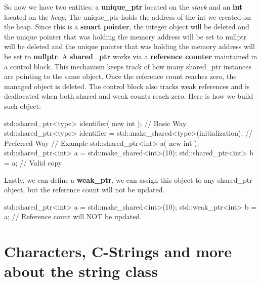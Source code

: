 \documentclass{report}
\begin{document}
    \bigbreak \noindent 
    So now we have two entities: a \textbf{unique\_ptr} located on the \textit{stack} and an \textbf{int} located on the \textit{heap}. The unique\_ptr holds the address of the int we created on the heap. Since this is a \textbf{smart pointer}, the integer object will be deleted and the unique pointer that was holding the memory address will be set to nullptr will be deleted and the unique pointer that was holding the memory address will be set to \textbf{nullptr}.
    \bigbreak \noindent 
    A \textbf{shared\_ptr} works via a \textbf{reference counter} maintained in a control block. This mechanism keeps track of how many shared\_ptr instances are pointing to the same object. Once the reference count reaches zero, the managed object is deleted. The control block also tracks weak references and is deallocated when both shared and weak counts reach zero. Here is how we build such object:
    \bigbreak \noindent 
    
    \begin{cppcode}
std::shared_ptr<type> identifier( new int ); // Basic Way
std::shared_ptr<type> identifier = std::make_shared<type>(initialization); // Preferred Way
// Example
std::shared_ptr<int> a( new int );
std::shared_ptr<int> a = std::make_shared<int>(10);
std::shared_ptr<int> b = a; // Valid copy
    \end{cppcode}
    

    \bigbreak \noindent 
    Lastly, we can define a \textbf{weak\_ptr}, we can assign this object to any shared\_ptr object, but the reference count will not be updated.
    \bigbreak \noindent 
    
    \begin{cppcode}
std::shared_ptr<int> a = std::make_shared<int>(10);
std::weak_ptr<int> b = a; // Reference count will NOT be updated.
    \end{cppcode}
    

    \pagebreak \bigbreak \noindent 
    \section{\LARGE Characters, C-Strings and more about the string class}
    \bigbreak \noindent 
\end{document}

